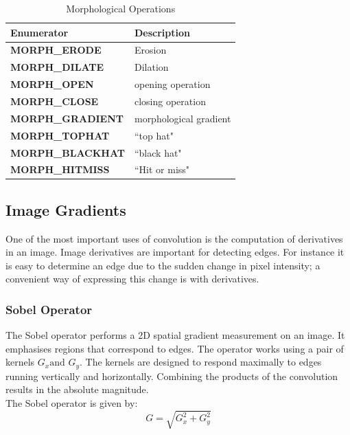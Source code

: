 \documentclass{article}
\theoremstyle{definition}
\theoremstyle{remark}
\begin{document}
\begin{table}[H]
    \centering
    \def\arraystretch{1.1}%
    \begin{tabular}{ p{5cm} p{7cm} } 
	\hline
	Enumerator & Description \\
	\hline
	\textbf{\footnotesize{MORPH\_ERODE}} & Erosion \\
	\textbf{\footnotesize{MORPH\_DILATE}} & Dilation \\
	\textbf{\footnotesize{MORPH\_OPEN}} & opening operation \\
	\textbf{\footnotesize{MORPH\_CLOSE}} & closing operation \\
	\textbf{\footnotesize{MORPH\_GRADIENT}} & morphological gradient \\
	\textbf{\footnotesize{MORPH\_TOPHAT}} & ``top hat" \\
	\textbf{\footnotesize{MORPH\_BLACKHAT}} & ``black hat" \\
	\textbf{\footnotesize{MORPH\_HITMISS}} & ``Hit or miss" \\
	\hline
    \end{tabular}
    \caption{Morphological Operations}
\end{table}


\break


\subsection{Image Gradients}

One of the most important uses of convolution is the computation of derivatives in an image. Image derivatives are important for detecting edges. For instance it is easy to determine an edge due to the sudden change in pixel intensity; a convenient way of expressing this change is with derivatives. 


\subsubsection{Sobel Operator}

The Sobel operator performs a 2D spatial gradient measurement on an image. It emphasises regions that correspond to edges. The operator works using a pair of kernels $ G_x \text{and } G_y $. The kernels are designed to respond maximally to edges running vertically and horizontally. Combining the products of the convolution results in the absolute magnitude.\\

\noindent The Sobel operator is given by:
\begin{equation}
    G = \sqrt{G_x^2 + G_y^2}
\end{equation}
\end{document}
